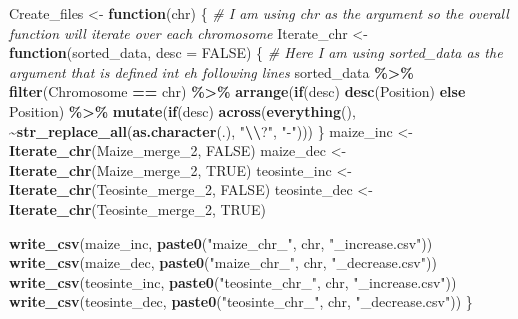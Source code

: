 \documentclass[
]{article}
\newenvironment{Shaded}{\begin{snugshade}}{\end{snugshade}}
\newcommand{\AttributeTok}[1]{\textcolor[rgb]{0.13,0.29,0.53}{#1}}
\newcommand{\CommentTok}[1]{\textcolor[rgb]{0.56,0.35,0.01}{\textit{#1}}}
\newcommand{\ConstantTok}[1]{\textcolor[rgb]{0.56,0.35,0.01}{#1}}
\newcommand{\ControlFlowTok}[1]{\textcolor[rgb]{0.13,0.29,0.53}{\textbf{#1}}}
\newcommand{\FunctionTok}[1]{\textcolor[rgb]{0.13,0.29,0.53}{\textbf{#1}}}
\newcommand{\NormalTok}[1]{#1}
\newcommand{\OtherTok}[1]{\textcolor[rgb]{0.56,0.35,0.01}{#1}}
\newcommand{\SpecialCharTok}[1]{\textcolor[rgb]{0.81,0.36,0.00}{\textbf{#1}}}
\newcommand{\StringTok}[1]{\textcolor[rgb]{0.31,0.60,0.02}{#1}}
\begin{document}
\begin{Shaded}
\begin{Highlighting}[]
\NormalTok{Create\_files }\OtherTok{\textless{}{-}} \ControlFlowTok{function}\NormalTok{(chr) \{ }\CommentTok{\# I am using chr as the argument so the overall function will iterate over each chromosome}
\NormalTok{  Iterate\_chr }\OtherTok{\textless{}{-}} \ControlFlowTok{function}\NormalTok{(sorted\_data, }\AttributeTok{desc =} \ConstantTok{FALSE}\NormalTok{) \{ }\CommentTok{\# Here I am using sorted\_data as the argument that is defined int eh following lines}
\NormalTok{    sorted\_data }\SpecialCharTok{\%\textgreater{}\%}
      \FunctionTok{filter}\NormalTok{(Chromosome }\SpecialCharTok{==}\NormalTok{ chr) }\SpecialCharTok{\%\textgreater{}\%}
      \FunctionTok{arrange}\NormalTok{(}\ControlFlowTok{if}\NormalTok{(desc) }\FunctionTok{desc}\NormalTok{(Position) }\ControlFlowTok{else}\NormalTok{ Position) }\SpecialCharTok{\%\textgreater{}\%}
      \FunctionTok{mutate}\NormalTok{(}\ControlFlowTok{if}\NormalTok{(desc) }\FunctionTok{across}\NormalTok{(}\FunctionTok{everything}\NormalTok{(), }\SpecialCharTok{\textasciitilde{}}\FunctionTok{str\_replace\_all}\NormalTok{(}\FunctionTok{as.character}\NormalTok{(.), }\StringTok{"}\SpecialCharTok{\textbackslash{}\textbackslash{}}\StringTok{?"}\NormalTok{, }\StringTok{"{-}"}\NormalTok{)))}
\NormalTok{  \}}
\NormalTok{  maize\_inc }\OtherTok{\textless{}{-}} \FunctionTok{Iterate\_chr}\NormalTok{(Maize\_merge\_2, }\ConstantTok{FALSE}\NormalTok{)}
\NormalTok{  maize\_dec }\OtherTok{\textless{}{-}} \FunctionTok{Iterate\_chr}\NormalTok{(Maize\_merge\_2, }\ConstantTok{TRUE}\NormalTok{)}
\NormalTok{  teosinte\_inc }\OtherTok{\textless{}{-}} \FunctionTok{Iterate\_chr}\NormalTok{(Teosinte\_merge\_2, }\ConstantTok{FALSE}\NormalTok{)}
\NormalTok{  teosinte\_dec }\OtherTok{\textless{}{-}} \FunctionTok{Iterate\_chr}\NormalTok{(Teosinte\_merge\_2, }\ConstantTok{TRUE}\NormalTok{)}
  
  \FunctionTok{write\_csv}\NormalTok{(maize\_inc, }\FunctionTok{paste0}\NormalTok{(}\StringTok{"maize\_chr\_"}\NormalTok{, chr, }\StringTok{"\_increase.csv"}\NormalTok{))}
  \FunctionTok{write\_csv}\NormalTok{(maize\_dec, }\FunctionTok{paste0}\NormalTok{(}\StringTok{"maize\_chr\_"}\NormalTok{, chr, }\StringTok{"\_decrease.csv"}\NormalTok{))}
  \FunctionTok{write\_csv}\NormalTok{(teosinte\_inc, }\FunctionTok{paste0}\NormalTok{(}\StringTok{"teosinte\_chr\_"}\NormalTok{, chr, }\StringTok{"\_increase.csv"}\NormalTok{))}
  \FunctionTok{write\_csv}\NormalTok{(teosinte\_dec, }\FunctionTok{paste0}\NormalTok{(}\StringTok{"teosinte\_chr\_"}\NormalTok{, chr, }\StringTok{"\_decrease.csv"}\NormalTok{))}
\NormalTok{\}}
\end{Highlighting}
\end{Shaded}
\end{document}
